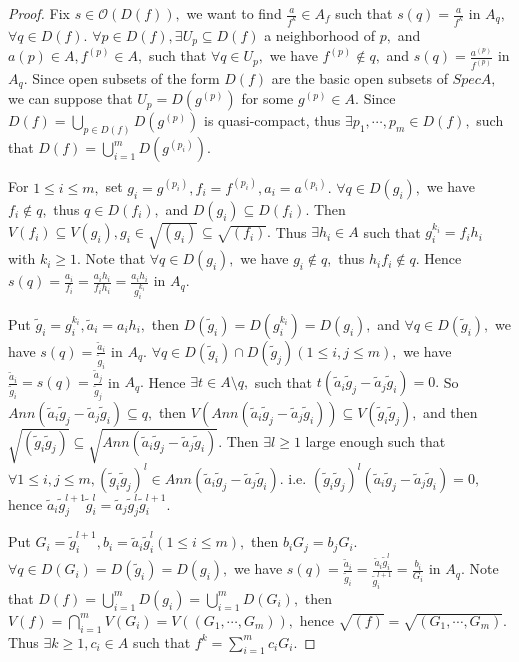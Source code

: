\begin{proof}
Fix $s\in\mathcal {O}(D(f)),$ we want to find $\frac{a}{f^k}\in A_f$
such that $s(q)=\frac{a}{f^k}$ in $A_q,$ $\forall q\in D(f).$
$\forall p\in D(f),\exists U_p\subseteq D(f)$ a neighborhood of $p,$
and $a{(p)}\in A,f^{(p)}\in A,$ such that $\forall q\in U_p,$ we
have $f^{(p)}\not\in q,$ and $s(q)=\frac{a^{(p)}}{f^{(p)}}$ in
$A_q.$ Since open subsets of the form $D(f)$ are the basic open
subsets of $SpecA,$ we can suppose that $U_p=D(g^{(p)})$ for some
$g^{(p)}\in A.$ Since $D(f)=\bigcup\limits_{p\in D(f)}D(g^{(p)})$ is
quasi-compact, thus $\exists p_1,\cdots,p_m\in D(f),$ such that
$D(f)=\bigcup\limits_{i=1}^m D(g^{(p_i)}).$

For $1\leqslant i\leqslant m,$ set
$g_i=g^{(p_i)},f_i=f^{(p_i)},a_i=a^{(p_i)}.$ $\forall q\in D(g_i),$
we have $f_i\not\in q,$ thus $q\in D(f_i),$ and $D(g_i)\subseteq
D(f_i).$ Then $V(f_i)\subseteq
V(g_i),g_i\in\sqrt{(g_i)}\subseteq\sqrt{(f_i)}.$ Thus $\exists
h_i\in A$ such that $g_i^{k_i}=f_ih_i$ with $k_i\geqslant 1.$ Note
that $\forall q\in D(g_i),$ we have $g_i\not\in q,$ thus
$h_if_i\not\in q.$ Hence
$s(q)=\frac{a_i}{f_i}=\frac{a_ih_i}{f_ih_i}=\frac{a_ih_i}{g_i^{k_i}}$
in $A_q.$

Put $\tilde{g}_i=g_i^{k_i},\tilde{a}_i=a_ih_i,$ then
$D(\tilde{g}_i)=D(g_i^{k_i})=D(g_i),$ and $\forall q\in
D(\tilde{g}_i),$ we have $s(q)=\frac{\tilde{a}_i}{\tilde{g}_i}$ in
$A_q.$ $\forall q\in D(\tilde{g}_i)\cap D(\tilde{g}_j)(1\leqslant
i,j\leqslant m),$ we have
$\frac{\tilde{a}_i}{\tilde{g}_i}=s(q)=\frac{\tilde{a}_j}{\tilde{g}_j}$
in $A_q.$ Hence $\exists t\in A\setminus q,$ such that
$t(\tilde{a}_i\tilde{g}_j-\tilde{a}_j\tilde{g}_i)=0.$ So
$Ann(\tilde{a}_i\tilde{g}_j-\tilde{a}_j\tilde{g}_i)\subseteq q,$
then $V(Ann(\tilde{a}_i\tilde{g}_j-\tilde{a}_j\tilde{g}_i))\subseteq
V(\tilde{g}_i\tilde{g}_j),$ and then
$\sqrt{(\tilde{g}_i\tilde{g}_j)} \subseteq
\sqrt{Ann(\tilde{a}_i\tilde{g}_j-\tilde{a}_j\tilde{g}_i)}.$ Then
$\exists l\geqslant 1$ large enough such that $\forall 1\leqslant
i,j\leqslant m, (\tilde{g}_i\tilde{g}_j)^l\in
Ann(\tilde{a}_i\tilde{g}_j-\tilde{a}_j\tilde{g}_i).$ i.e.
$(\tilde{g}_i\tilde{g}_j)^l(\tilde{a}_i\tilde{g}_j-\tilde{a}_j\tilde{g}_i)=0,$
hence $\tilde{a}_i\tilde{g}_j^{l+1}\tilde{g}_i^l =
\tilde{a}_j\tilde{g}_j^l\tilde{g}_i^{l+1}.$

Put $G_i=\tilde{g}_i^{l+1}, b_i=\tilde{a}_i\tilde{g}_i^l(1\leqslant
i\leqslant m),$ then $b_iG_j=b_jG_i.$ $\forall q\in
D(G_i)=D(\tilde{g}_i)=D(g_i),$ we have
$s(q)=\frac{\tilde{a}_i}{\tilde{g}_i} =
\frac{\tilde{a}_i\tilde{g}_i^l}{\tilde{g}_i^{l+1}} =
\frac{b_i}{G_i}$ in $A_q.$ Note that
$D(f)=\bigcup\limits_{i=1}^mD(g_i)=\bigcup\limits_{i=1}^mD(G_i),$
then $V(f)=\bigcap\limits_{i=1}^mV(G_i)=V((G_1,\cdots,G_m)),$ hence
$\sqrt{(f)}=\sqrt{(G_1,\cdots,G_m)}.$ Thus $\exists k\geqslant
1,c_i\in A$ such that $f^k=\sum\limits_{i=1}^mc_iG_i.$


\end{proof}
